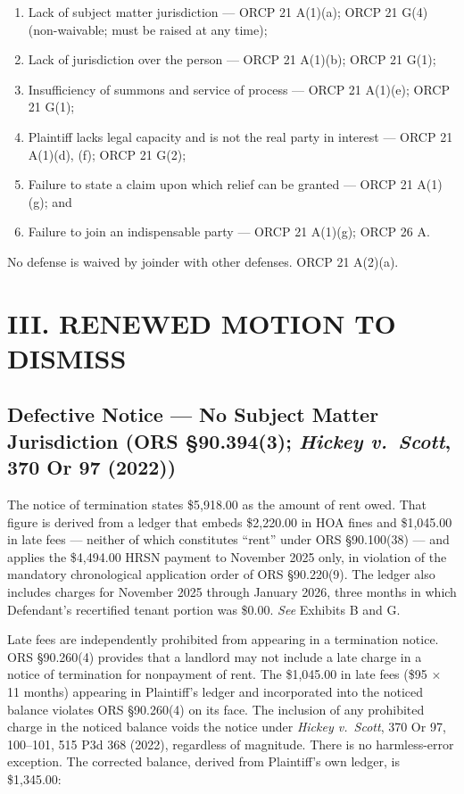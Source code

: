 \documentclass[12pt,letterpaper]{article}
\begin{document}
\begin{enumerate}[label=(\alph*)]
  \item Lack of subject matter jurisdiction --- ORCP 21 A(1)(a); ORCP 21 G(4) (non-waivable; must be raised at any time);
  \item Lack of jurisdiction over the person --- ORCP 21 A(1)(b); ORCP 21 G(1);
  \item Insufficiency of summons and service of process --- ORCP 21 A(1)(e); ORCP 21 G(1);
  \item Plaintiff lacks legal capacity and is not the real party in interest --- ORCP 21 A(1)(d), (f); ORCP 21 G(2);
  \item Failure to state a claim upon which relief can be granted --- ORCP 21 A(1)(g); and
  \item Failure to join an indispensable party --- ORCP 21 A(1)(g); ORCP 26 A.
\end{enumerate}

No defense is waived by joinder with other defenses. ORCP 21 A(2)(a).

\section*{III. RENEWED MOTION TO DISMISS}

\subsection{Defective Notice --- No Subject Matter Jurisdiction (ORS \S90.394(3); \textit{Hickey v.\ Scott}, 370 Or 97 (2022))}

The notice of termination states \$5,918.00 as the amount of rent owed. That figure is derived from a ledger that embeds \$2,220.00 in HOA fines and \$1,045.00 in late fees --- neither of which constitutes ``rent'' under ORS \S90.100(38) --- and applies the \$4,494.00 HRSN payment to November 2025 only, in violation of the mandatory chronological application order of ORS \S90.220(9). The ledger also includes charges for November 2025 through January 2026, three months in which Defendant's recertified tenant portion was \$0.00. \textit{See} Exhibits B and G.

Late fees are independently prohibited from appearing in a termination notice. ORS \S90.260(4) provides that a landlord may not include a late charge in a notice of termination for nonpayment of rent. The \$1,045.00 in late fees (\$95 $\times$ 11 months) appearing in Plaintiff's ledger and incorporated into the noticed balance violates ORS \S90.260(4) on its face. The inclusion of any prohibited charge in the noticed balance voids the notice under \textit{Hickey v.\ Scott}, 370 Or 97, 100--101, 515 P3d 368 (2022), regardless of magnitude. There is no harmless-error exception. The corrected balance, derived from Plaintiff's own ledger, is \$1,345.00:
\end{document}
